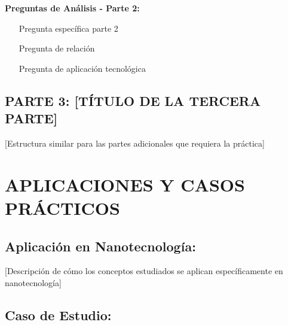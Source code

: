 \documentclass[12pt,a4paper]{article}
\begin{document}
	\begin{preguntabox}
		\textbf{Preguntas de Análisis - Parte 2:}
		\begin{enumerate}
			\item [Pregunta específica parte 2]
			
			\vspace{1.5cm}
			
			\item [Pregunta de relación]
			
			\vspace{1.5cm}
			
			\item [Pregunta de aplicación tecnológica]
			
			\vspace{1.5cm}
		\end{enumerate}
	\end{preguntabox}
	
	
	\subsection{PARTE 3: [TÍTULO DE LA TERCERA PARTE]}
	
	[Estructura similar para las partes adicionales que requiera la práctica]
	
	
	\section{APLICACIONES Y CASOS PRÁCTICOS}
	
	\subsection{Aplicación en Nanotecnología:}
	
	[Descripción de cómo los conceptos estudiados se aplican específicamente en nanotecnología]
	
	\subsection{Caso de Estudio:}
	
\end{document}
